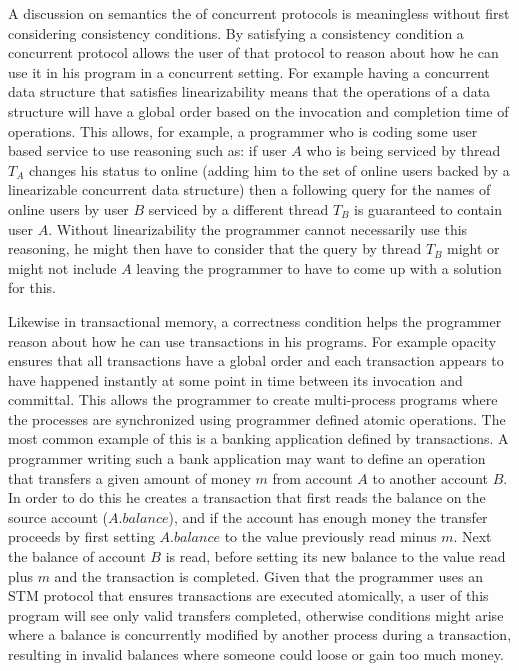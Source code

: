 A discussion on semantics the of concurrent protocols is meaningless without
first considering consistency conditions.
By satisfying a consistency condition a concurrent protocol allows the
user of that protocol to reason about how he can use it in his program
in a concurrent setting.
For example having a concurrent data structure that satisfies linearizability
means that the operations of a data structure will have a global order
based on the invocation and completion time of operations.
This allows, for example, a programmer who is coding some user based service
to use reasoning such as: if user $A$ who
is being serviced by thread $T_A$ changes his status to online (adding him
to the set of online users backed by a linearizable concurrent data structure)
then a following query for the names of online users
by user $B$ serviced by a different thread $T_B$ is guaranteed to contain
user $A$.
Without linearizability the programmer cannot necessarily use this reasoning, he might then
have to consider that the query by thread $T_B$ might or might not include $A$
leaving the programmer to have to come up with a solution for this.

Likewise in transactional memory, a correctness condition helps the
programmer reason about how he can use transactions in his programs.
For example opacity ensures that all transactions have a global order
and each transaction appears to have happened instantly at some point
in time between its invocation and committal.
This allows the programmer to create multi-process programs where the processes are
synchronized using programmer defined atomic operations.
The most common example of this is a banking application defined by transactions.
A programmer writing such a bank application may want to define an operation
that transfers a given amount of money $m$ from account $A$ to another account $B$.
In order to do this he creates a transaction that first reads the balance
on the source account ($A.balance$), and if the account has enough money the transfer
proceeds by first setting $A.balance$ to the value previously read minus $m$.
Next the balance of account $B$ is read, before setting its new balance
to the value read plus $m$ and the transaction is completed.
Given that the programmer uses an STM protocol that ensures transactions are executed
atomically, a user of this program will see only valid transfers
completed, otherwise conditions might arise where a balance is concurrently
modified by another process during a transaction, resulting in invalid balances
where someone could loose or gain too much money.

